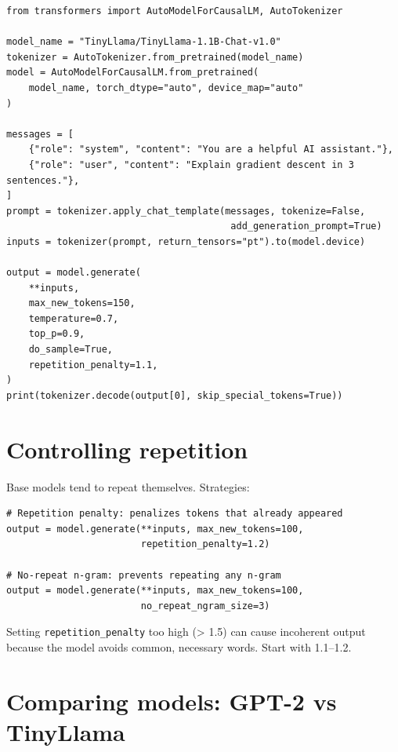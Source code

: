 \begin{verbatim}
from transformers import AutoModelForCausalLM, AutoTokenizer

model_name = "TinyLlama/TinyLlama-1.1B-Chat-v1.0"
tokenizer = AutoTokenizer.from_pretrained(model_name)
model = AutoModelForCausalLM.from_pretrained(
    model_name, torch_dtype="auto", device_map="auto"
)

messages = [
    {"role": "system", "content": "You are a helpful AI assistant."},
    {"role": "user", "content": "Explain gradient descent in 3 sentences."},
]
prompt = tokenizer.apply_chat_template(messages, tokenize=False,
                                        add_generation_prompt=True)
inputs = tokenizer(prompt, return_tensors="pt").to(model.device)

output = model.generate(
    **inputs,
    max_new_tokens=150,
    temperature=0.7,
    top_p=0.9,
    do_sample=True,
    repetition_penalty=1.1,
)
print(tokenizer.decode(output[0], skip_special_tokens=True))
\end{verbatim}

\section{Controlling repetition}

Base models tend to repeat themselves. Strategies:

\begin{verbatim}
# Repetition penalty: penalizes tokens that already appeared
output = model.generate(**inputs, max_new_tokens=100,
                        repetition_penalty=1.2)

# No-repeat n-gram: prevents repeating any n-gram
output = model.generate(**inputs, max_new_tokens=100,
                        no_repeat_ngram_size=3)
\end{verbatim}

\begin{warningbox}
Setting \texttt{repetition\_penalty} too high (> 1.5) can cause incoherent output because the model avoids common, necessary words. Start with 1.1--1.2.
\end{warningbox}

\section{Comparing models: GPT-2 vs TinyLlama}

